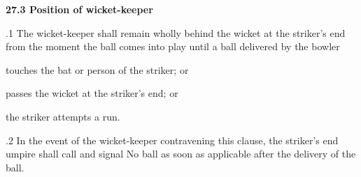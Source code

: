 \documentclass[12pt]{article}
\begin{document}
\vspace{\baselineskip}
{\fontsize{11pt}{13.2pt}\selectfont \textbf{27.3 \tabto{0.47in} Position of wicket-keeper}\par}\par


\vspace{\baselineskip}
\begin{adjustwidth}{0.5in}{0.01in}
{\fontsize{9pt}{10.8pt}.1 \tabto{0.49in} The wicket-keeper shall remain wholly behind the wicket at the striker’s end from the moment the ball comes into play until a ball delivered by the bowler\par}\par

\end{adjustwidth}


\vspace{\baselineskip}
\begin{adjustwidth}{0.5in}{0.0in}
{\fontsize{9pt}{10.8pt}\selectfont touches the bat or person of the striker; or\par}\par

\end{adjustwidth}


\vspace{\baselineskip}
\begin{adjustwidth}{0.5in}{0.0in}
{\fontsize{9pt}{10.8pt}\selectfont passes the wicket at the striker’s end; or\par}\par

\end{adjustwidth}


\vspace{\baselineskip}
\begin{adjustwidth}{0.5in}{0.0in}
{\fontsize{9pt}{10.8pt}\selectfont the striker attempts a run.\par}\par

\end{adjustwidth}


\vspace{\baselineskip}
\begin{adjustwidth}{0.5in}{0.14in}
{\fontsize{9pt}{10.8pt}.2 \tabto{0.49in} In the event of the wicket-keeper contravening this clause, the striker’s end umpire shall call and signal No ball as soon as applicable after the delivery of the ball.\par}\par

\end{adjustwidth}
\end{document}
